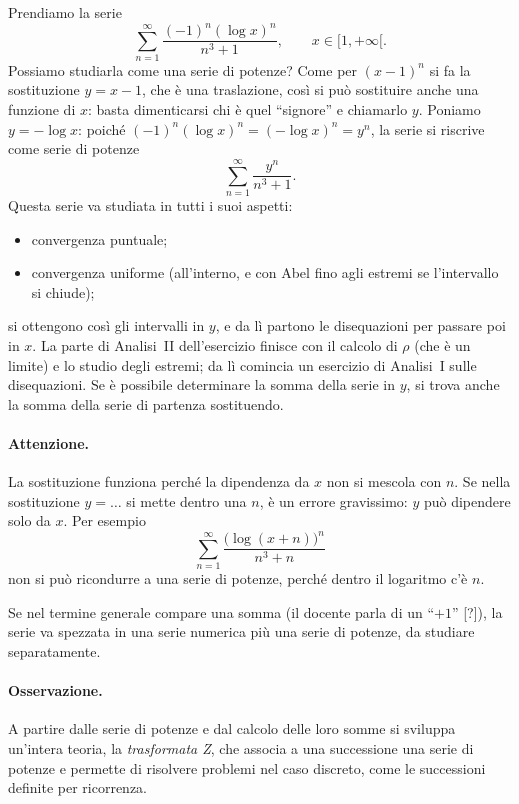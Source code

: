 Prendiamo la serie
\[
  \sum_{n=1}^{\infty} \frac{(-1)^n (\log x)^n}{n^3+1} , \qquad x\in[1,+\infty[ .
\]
Possiamo studiarla come una serie di potenze?
Come per $(x-1)^n$ si fa la sostituzione $y=x-1$, che è una traslazione, così si può sostituire anche una
funzione di $x$: basta dimenticarsi chi è quel ``signore'' e chiamarlo $y$.
Poniamo $y=-\log x$: poiché $(-1)^n(\log x)^n = (-\log x)^n = y^n$, la serie si riscrive come serie di potenze
\[
  \sum_{n=1}^{\infty} \frac{y^n}{n^3+1} .
\]
Questa serie va studiata in tutti i suoi aspetti:
\begin{itemize}
  \item convergenza puntuale;
  \item convergenza uniforme (all'interno, e con Abel fino agli estremi se l'intervallo si chiude);
\end{itemize}
si ottengono così gli intervalli in $y$, e da lì partono le disequazioni per passare poi in $x$.
La parte di Analisi~II dell'esercizio finisce con il calcolo di $\rho$ (che è un limite) e lo studio degli
estremi; da lì comincia un esercizio di Analisi~I sulle disequazioni. Se è possibile determinare la somma della
serie in $y$, si trova anche la somma della serie di partenza sostituendo.

\paragraph{Attenzione.}
La sostituzione funziona perché la dipendenza da $x$ non si mescola con $n$.
Se nella sostituzione $y=\dots$ si mette dentro una $n$, è un errore gravissimo: $y$ può dipendere solo da $x$.
Per esempio
\[
  \sum_{n=1}^{\infty} \frac{\bigl(\log(x+n)\bigr)^n}{n^3+n}
\]
non si può ricondurre a una serie di potenze, perché dentro il logaritmo c'è $n$.

Se nel termine generale compare una somma (il docente parla di un ``$+1$'' [?]), la serie va spezzata in una
serie numerica più una serie di potenze, da studiare separatamente.

\paragraph{Osservazione.}
A partire dalle serie di potenze e dal calcolo delle loro somme si sviluppa un'intera teoria, la
\emph{trasformata Z}, che associa a una successione una serie di potenze e permette di risolvere problemi nel
caso discreto, come le successioni definite per ricorrenza.

